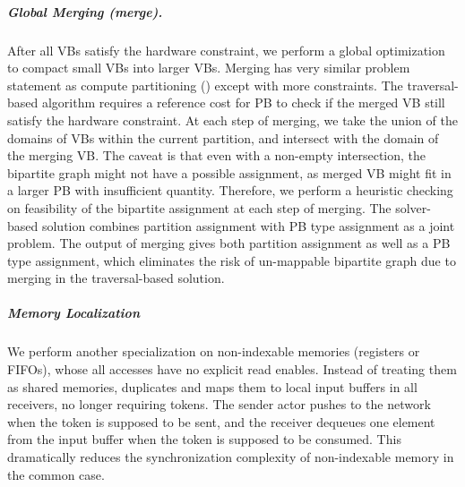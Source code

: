 \subparagraph{Global Merging (merge).}
After all VBs satisfy the hardware constraint, we perform a global optimization to compact small VBs into  larger VBs. 
Merging has very similar problem statement as compute partitioning () except with more constraints.
The traversal-based algorithm requires a reference cost for PB to check if the merged VB still satisfy the hardware constraint.
At each step of merging, we take the union of the domains of VBs within the current partition, and intersect with the domain of the merging VB.
The caveat is that even with a non-empty intersection, the bipartite graph might not have a possible assignment, as merged VB might fit in a larger PB with insufficient quantity.
Therefore, we perform a heuristic checking on feasibility of the bipartite assignment at each step of merging.
The solver-based solution combines partition assignment with PB type assignment as a joint problem. 
The output of merging gives both partition assignment as well as a PB type assignment, which eliminates the risk of un-mappable bipartite graph due to merging in the traversal-based solution.

\subparagraph{Memory Localization}
We perform another specialization on non-indexable memories (registers or FIFOs), whose all accesses have no explicit read enables.
Instead of treating them as shared memories, \name{} duplicates and maps them to local input buffers in all receivers, no longer requiring tokens.
The sender actor pushes to the network when the token is supposed to be sent, and the receiver dequeues one element from the input buffer when the token is supposed to be consumed.
This dramatically reduces the synchronization complexity of non-indexable memory in the common case.

